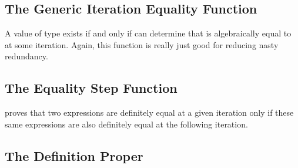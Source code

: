 \documentclass{report}
\begin{document}
\subsection{The Generic Iteration Equality Function}
A value of type     exists if and only if   can determine that  is algebraically equal to  at some iteration.  Again, this function is really just good for reducing nasty redundancy.

\subsection{The Equality Step Function}
 proves that two expressions are definitely equal at a given iteration only if these same expressions are also definitely equal at the following iteration.

\subsection{The Definition Proper}
\end{document}
